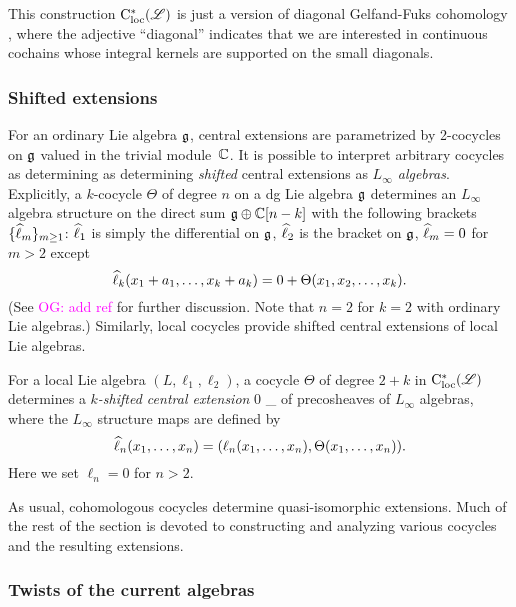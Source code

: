 \documentclass[10pt]{amsart}
\def\owen{\textcolor{magenta}{OG: }\textcolor{magenta}}
\begin{document}
\begin{rmk}
This construction $\cloc^*(\sL)$ is just a version of diagonal Gelfand-Fuks cohomology \cite{Fuks, LosikDiag},
where the adjective ``diagonal'' indicates that we are interested in continuous cochains whose integral kernels are supported on the small diagonals.
\end{rmk}

\subsubsection{Shifted extensions}

For an ordinary Lie algebra $\fg$, central extensions are parametrized by 2-cocycles on $\fg$ valued in the trivial module~$\CC$. 
It is possible to interpret arbitrary cocycles as determining as determining {\em shifted} central extensions as {\em $L_\infty$ algebras}.
Explicitly, a $k$-cocycle $\Theta$ of degree $n$ on a dg Lie algebra $\fg$ determines an $L_\infty$ algebra structure on the direct sum $\fg \oplus \CC[n-k]$ with the following brackets $\{\Hat{\ell}_m\}_{m \geq 1}$: $\Hat{\ell}_1$ is simply the differential on $\fg$, $\Hat{\ell}_2$ is the bracket on $\fg$, $\Hat{\ell}_m = 0$ for $m >2$ except
\[
\Hat{\ell}_k(x_1 + a_1, \ldots, x_k + a_k) = 0+ \Theta(x_1,x_2,\ldots, x_k).
\]
(See \owen{add ref} for further discussion. Note that $n=2$ for $k=2$ with ordinary Lie algebras.)
Similarly, local cocycles provide shifted central extensions of local Lie algebras.

\begin{dfn}
For a local Lie algebra $(L, \ell_1,\ell_2)$, a cocycle $\Theta$ of degree $2+k$ in $\cloc^*(\sL)$ determines a {\em $k$-shifted central extension}
\beqn\label{kext}
0 \to \CC[k] \to \Hat{\sL}_\theta \to \sL {}
\eeqn
of precosheaves of $L_\infty$ algebras, where the $L_\infty$ structure maps are defined by
\[
\Hat{\ell}_n(x_1,\ldots,x_n) = (\ell_n(x_1,\ldots,x_n), \Theta(x_1,\ldots,x_n)).
\]
Here we set $\ell_n = 0$ for $n > 2$.
\end{dfn}

As usual, cohomologous cocycles determine quasi-isomorphic extensions. 
Much of the rest of the section is devoted to constructing and analyzing various cocycles and the resulting extensions.

\subsubsection{Twists of the current algebras}
\end{document}
